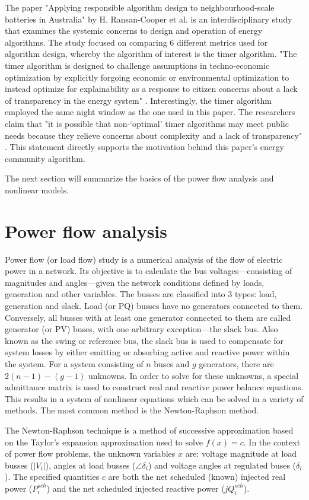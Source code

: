 \documentclass[a4paper,10pt]{report}
\begin{document}
The paper "Applying responsible algorithm design to neighbourhood-scale batteries in Australia" by H. Ransan-Cooper et al. is an interdisciplinary study that examines the systemic concerns to design and operation of energy algorithms. The study focused on comparing 6  different metrics used for algorithm design, whereby the algorithm of interest is the timer algorithm. "The timer algorithm is designed to challenge assumptions in techno-economic optimization by explicitly forgoing economic or environmental optimization to instead optimize for explainability as a response to citizen concerns about a lack of transparency in the energy system" \cite{RansanCooper2021}. Interestingly, the timer algorithm employed the same night window as the one used in this paper. The researchers claim that "it is possible that non-‘optimal’ timer algorithms may meet public needs because they relieve concerns about complexity and a lack of transparency" \cite{RansanCooper2021}. This statement directly supports the motivation behind this paper's energy community algorithm.

The next section will summarize the basics of the power flow analysis and nonlinear models.

\newpage
\section{Power flow analysis}
Power flow (or load flow) study is a numerical analysis of the flow of electric power in a network. Its objective is to calculate the bus voltages---consisting of magnitudes and angles---given the network conditions defined by loads, generation and other variables. The busses are classified into 3 types: load, generation and slack. Load (or PQ) busses have no generators connected to them. Conversely, all busses with at least one generator connected to them are called generator (or PV) buses, with one arbitrary exception---the slack bus. Also known as the swing or reference bus, the slack bus is used to compensate for system losses by either emitting or absorbing active and reactive power within the system. For a system consisting of $n$ buses and $g$ generators, there are $2(n-1)-(g-1)$ unknowns. In order to solve for these unknowns, a special admittance matrix is used to construct real and reactive power balance equations. This results in a system of nonlinear equations which can be solved in a variety of methods. The most common method is the Newton-Raphson method.

The Newton-Raphson technique is a method of successive approximation based on the Taylor's expansion approximation used to solve $f(x)=c$. In the context of power flow problems, the unknown variables $x$ are: voltage magnitude at load busses ($\lvert V_i\rvert$), angles at load busses ($\angle\delta_i$) and voltage angles at regulated buses ($\delta_i$). The specified quantities $c$ are both the net scheduled (known) injected real power ($P_i^{sch}$) and the net scheduled injected reactive power ($jQ_i^{sch}$).
\end{document}
